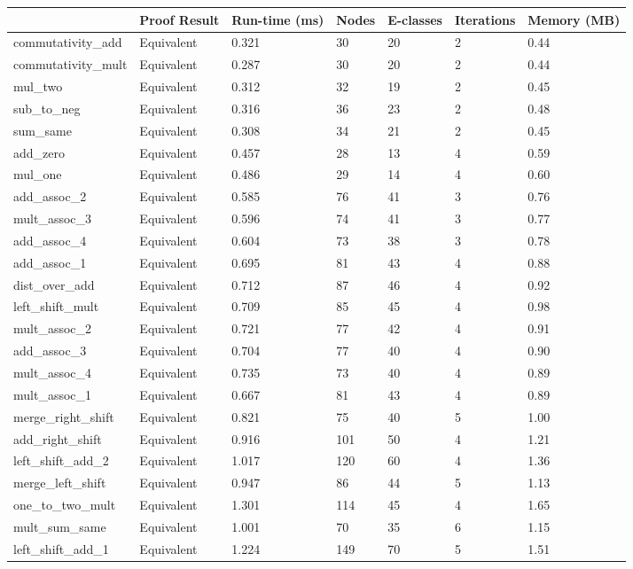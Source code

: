 \begin{tabular}{lllllll}
\toprule
 & Proof Result & Run-time (ms) & Nodes & E-classes & Iterations & Memory (MB) \\
\midrule
commutativity\_add & Equivalent & 0.321 & 30 & 20 & 2 & 0.44 \\
commutativity\_mult & Equivalent & 0.287 & 30 & 20 & 2 & 0.44 \\
mul\_two & Equivalent & 0.312 & 32 & 19 & 2 & 0.45 \\
sub\_to\_neg & Equivalent & 0.316 & 36 & 23 & 2 & 0.48 \\
sum\_same & Equivalent & 0.308 & 34 & 21 & 2 & 0.45 \\
add\_zero & Equivalent & 0.457 & 28 & 13 & 4 & 0.59 \\
mul\_one & Equivalent & 0.486 & 29 & 14 & 4 & 0.60 \\
add\_assoc\_2 & Equivalent & 0.585 & 76 & 41 & 3 & 0.76 \\
mult\_assoc\_3 & Equivalent & 0.596 & 74 & 41 & 3 & 0.77 \\
add\_assoc\_4 & Equivalent & 0.604 & 73 & 38 & 3 & 0.78 \\
add\_assoc\_1 & Equivalent & 0.695 & 81 & 43 & 4 & 0.88 \\
dist\_over\_add & Equivalent & 0.712 & 87 & 46 & 4 & 0.92 \\
left\_shift\_mult & Equivalent & 0.709 & 85 & 45 & 4 & 0.98 \\
mult\_assoc\_2 & Equivalent & 0.721 & 77 & 42 & 4 & 0.91 \\
add\_assoc\_3 & Equivalent & 0.704 & 77 & 40 & 4 & 0.90 \\
mult\_assoc\_4 & Equivalent & 0.735 & 73 & 40 & 4 & 0.89 \\
mult\_assoc\_1 & Equivalent & 0.667 & 81 & 43 & 4 & 0.89 \\
merge\_right\_shift & Equivalent & 0.821 & 75 & 40 & 5 & 1.00 \\
add\_right\_shift & Equivalent & 0.916 & 101 & 50 & 4 & 1.21 \\
left\_shift\_add\_2 & Equivalent & 1.017 & 120 & 60 & 4 & 1.36 \\
merge\_left\_shift & Equivalent & 0.947 & 86 & 44 & 5 & 1.13 \\
one\_to\_two\_mult & Equivalent & 1.301 & 114 & 45 & 4 & 1.65 \\
mult\_sum\_same & Equivalent & 1.001 & 70 & 35 & 6 & 1.15 \\
left\_shift\_add\_1 & Equivalent & 1.224 & 149 & 70 & 5 & 1.51 \\
\bottomrule
\end{tabular}
